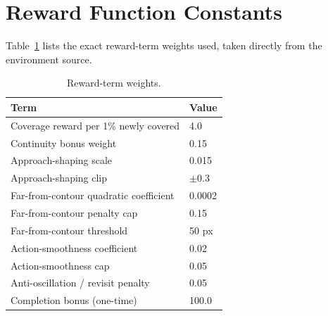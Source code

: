 \documentclass[conference]{IEEEtran}
\begin{document}
\section{Reward Function Constants}
\label{app:reward}

Table~\ref{tab:rewardkwargs} lists the exact reward-term weights used, taken directly from the environment source.

\begin{table}[h]
\centering
\caption{Reward-term weights.}
\label{tab:rewardkwargs}
\begin{tabular}{@{}ll@{}}
\toprule
Term & Value \\
\midrule
Coverage reward per 1\% newly covered & 4.0 \\
Continuity bonus weight & 0.15 \\
Approach-shaping scale & 0.015 \\
Approach-shaping clip & $\pm$0.3 \\
Far-from-contour quadratic coefficient & 0.0002 \\
Far-from-contour penalty cap & 0.15 \\
Far-from-contour threshold & 50 px \\
Action-smoothness coefficient & 0.02 \\
Action-smoothness cap & 0.05 \\
Anti-oscillation / revisit penalty & 0.05 \\
Completion bonus (one-time) & 100.0 \\
\bottomrule
\end{tabular}
\end{table}
\end{document}
